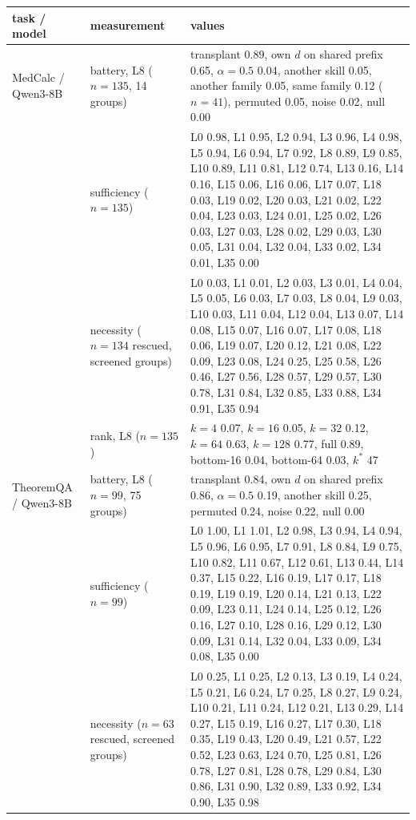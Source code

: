 \begin{tabular}{@{}p{}p{}p{}@{}}
\toprule
\rowcolor{TableHeader}
task / model & measurement & values \\
\midrule
MedCalc / Qwen3-8B & battery, L8 ($n=135$, 14 groups) & transplant 0.89, own $d$ on shared prefix 0.65, $\alpha{=}0.5$ 0.04, another skill 0.05, another family 0.05, same family 0.12 ($n=41$), permuted 0.05, noise 0.02, null 0.00 \\
 & sufficiency ($n=135$) & L0 0.98, L1 0.95, L2 0.94, L3 0.96, L4 0.98, L5 0.94, L6 0.94, L7 0.92, L8 0.89, L9 0.85, L10 0.89, L11 0.81, L12 0.74, L13 0.16, L14 0.16, L15 0.06, L16 0.06, L17 0.07, L18 0.03, L19 0.02, L20 0.03, L21 0.02, L22 0.04, L23 0.03, L24 0.01, L25 0.02, L26 0.03, L27 0.03, L28 0.02, L29 0.03, L30 0.05, L31 0.04, L32 0.04, L33 0.02, L34 0.01, L35 0.00 \\
 & necessity ($n=134$ rescued, screened groups) & L0 0.03, L1 0.01, L2 0.03, L3 0.01, L4 0.04, L5 0.05, L6 0.03, L7 0.03, L8 0.04, L9 0.03, L10 0.03, L11 0.04, L12 0.04, L13 0.07, L14 0.08, L15 0.07, L16 0.07, L17 0.08, L18 0.06, L19 0.07, L20 0.12, L21 0.08, L22 0.09, L23 0.08, L24 0.25, L25 0.58, L26 0.46, L27 0.56, L28 0.57, L29 0.57, L30 0.78, L31 0.84, L32 0.85, L33 0.88, L34 0.91, L35 0.94 \\
 & rank, L8 ($n=135$) & $k{=}4$ 0.07, $k{=}16$ 0.05, $k{=}32$ 0.12, $k{=}64$ 0.63, $k{=}128$ 0.77, full 0.89, bottom-16 0.04, bottom-64 0.03, $k^{*}$ 47 \\
\midrule
TheoremQA / Qwen3-8B & battery, L8 ($n=99$, 75 groups) & transplant 0.84, own $d$ on shared prefix 0.86, $\alpha{=}0.5$ 0.19, another skill 0.25, permuted 0.24, noise 0.22, null 0.00 \\
 & sufficiency ($n=99$) & L0 1.00, L1 1.01, L2 0.98, L3 0.94, L4 0.94, L5 0.96, L6 0.95, L7 0.91, L8 0.84, L9 0.75, L10 0.82, L11 0.67, L12 0.61, L13 0.44, L14 0.37, L15 0.22, L16 0.19, L17 0.17, L18 0.19, L19 0.19, L20 0.14, L21 0.13, L22 0.09, L23 0.11, L24 0.14, L25 0.12, L26 0.16, L27 0.10, L28 0.16, L29 0.12, L30 0.09, L31 0.14, L32 0.04, L33 0.09, L34 0.08, L35 0.00 \\
 & necessity ($n=63$ rescued, screened groups) & L0 0.25, L1 0.25, L2 0.13, L3 0.19, L4 0.24, L5 0.21, L6 0.24, L7 0.25, L8 0.27, L9 0.24, L10 0.21, L11 0.24, L12 0.21, L13 0.29, L14 0.27, L15 0.19, L16 0.27, L17 0.30, L18 0.35, L19 0.43, L20 0.49, L21 0.57, L22 0.52, L23 0.63, L24 0.70, L25 0.81, L26 0.78, L27 0.81, L28 0.78, L29 0.84, L30 0.86, L31 0.90, L32 0.89, L33 0.92, L34 0.90, L35 0.98 \\

\end{tabular}
